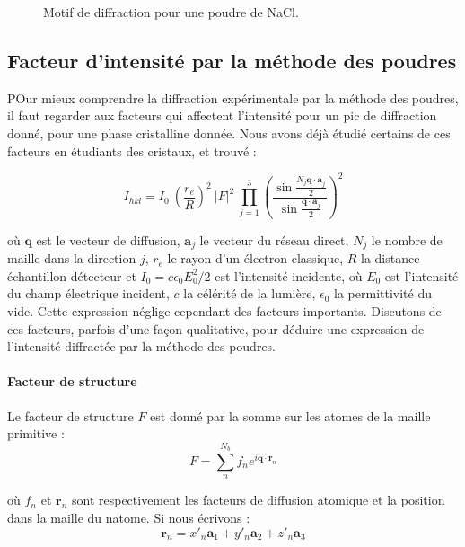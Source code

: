 \begin{figure}
    \TODO
    \caption{Motif de diffraction pour une poudre de NaCl.}
    \label{fig:poudrepic}
\end{figure}


\subsection{Facteur d'intensité par la méthode des poudres}

POur mieux comprendre la diffraction expérimentale par la méthode des poudres, il faut regarder aux facteurs qui affectent l'intensité pour un pic de diffraction donné, pour une phase cristalline donnée. Nous avons déjà étudié certains de ces facteurs en étudiants des cristaux, et trouvé :

\begin{equation}
    I_{hkl} = I_0 \ 
        \left( \frac{r_e}{R} \right)^2 \ 
        |F|^2 \ 
        \prod_{j=1}^3 \left(
            \frac{ \sin \frac{N_j \mathbf{q \cdot a}_j}{2} }{ \sin \frac{\mathbf{q\cdot a}_j}{2} } \right)^2
    \label{eq:facteurintensite}
\end{equation}

où $\mathbf{q}$ est le vecteur de diffusion, $\mathbf{a}_j$ le vecteur du réseau direct, $N_j$ le nombre de maille dans la direction $j$, $r_e$ le rayon d'un électron classique, $R$ la distance échantillon-détecteur et $I_0 = c\epsilon_0 E_0^2/2$ est l'intensité incidente, où $E_0$ est l'intensité du champ électrique incident, $c$ la célérité de la lumière, $\epsilon_0$ la permittivité du vide. Cette expression néglige cependant des facteurs importants. Discutons de ces facteurs, parfois d'une façon qualitative, pour déduire une expression de l'intensité diffractée par la méthode des poudres.

\paragraph{Facteur de structure}

Le facteur de structure $F$ est donné par la somme sur les atomes de la maille primitive :
\begin{equation}
    F = \sum_n^{N_b} f_n e^{i\mathbf{q\cdot r}_n}
\end{equation}

où $f_n$ et $\mathbf{r}_n$ sont respectivement les facteurs de diffusion atomique et la position dans la maille du n\ieme atome. Si nous écrivons :
\begin{equation}
    \mathbf{r}_n = x'_n \mathbf{a}_1 + y'_n \mathbf{a}_2 + z'_n \mathbf{a}_3
\end{equation}

